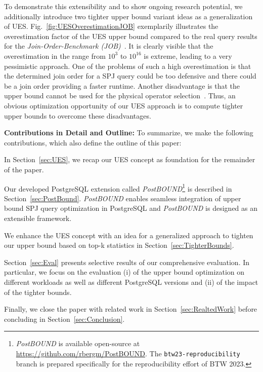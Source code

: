 To demonstrate this extensibility and to show ongoing research potential, we additionally introduce two tighter upper bound variant ideas as a generalization of UES. 
Fig.~\ref{fig:UESOverestimationJOB} exemplarily illustrates the overestimation factor of the UES upper bound compared to the real query results for the \emph{Join-Order-Benchmark (JOB)}~\cite{DBLP:journals/pvldb/LeisGMBK015}.
It is clearly visible that the overestimation in the range from $10^3$ to $10^{16}$ is extreme, leading to a very pessimistic approach. 
One of the problems of such a high overestimation is that the determined join order for a SPJ query could be too defensive and there could be a join order providing a faster runtime. 
Another disadvantage is that the upper bound cannot be used for the physical operator selection~\cite{hertzschuch-21-ues,DBLP:journals/pvldb/HertzschuchHHL22}. 
Thus, an obvious optimization opportunity of our UES approach is to compute tighter upper bounds to overcome these disadvantages.
 
\textbf{Contributions in Detail and Outline:} To summarize, we make the following contributions, which also define the outline of this paper:
\begin{compactitem}
\item In Section~\ref{sec:UES}, we recap our UES concept as foundation for the remainder of the paper.
\item Our developed PostgreSQL extension called \emph{PostBOUND}\footnote{\emph{PostBOUND} is available open-source at \url{https://github.com/rbergm/PostBOUND}. The \texttt{btw23-reproducibility} branch is prepared specifically for the reproducibility effort of BTW 2023.} is described in Section~\ref{sec:PostBound}. \emph{PostBOUND} enables seamless integration of upper bound SPJ query optimization in PostgreSQL and \emph{PostBOUND} is designed as an extensible framework.%
\item We enhance the UES concept with an idea for a generalized approach to tighten our upper bound based on top-k statistics in Section~\ref{sec:TighterBounds}. 
\item Section~\ref{sec:Eval} presents selective results of our comprehensive evaluation. In particular, we focus on the evaluation (i) of the upper bound optimization on different workloads as well as different PostgreSQL versions and (ii) of the impact of the tighter bounds.  
\end{compactitem}
Finally, we close the paper with related work in Section~\ref{sec:RealtedWork} before concluding in Section~\ref{sec:Conclusion}. 


